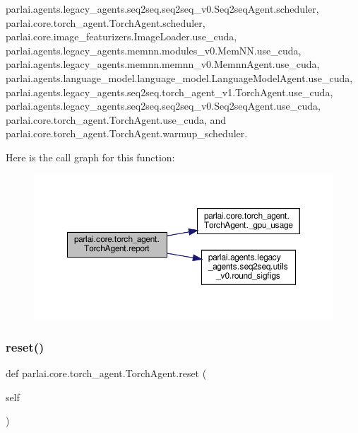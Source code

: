 parlai.\+agents.\+legacy\+\_\+agents.\+seq2seq.\+seq2seq\+\_\+v0.\+Seq2seq\+Agent.\+scheduler, parlai.\+core.\+torch\+\_\+agent.\+Torch\+Agent.\+scheduler, parlai.\+core.\+image\+\_\+featurizers.\+Image\+Loader.\+use\+\_\+cuda, parlai.\+agents.\+legacy\+\_\+agents.\+memnn.\+modules\+\_\+v0.\+Mem\+N\+N.\+use\+\_\+cuda, parlai.\+agents.\+legacy\+\_\+agents.\+memnn.\+memnn\+\_\+v0.\+Memnn\+Agent.\+use\+\_\+cuda, parlai.\+agents.\+language\+\_\+model.\+language\+\_\+model.\+Language\+Model\+Agent.\+use\+\_\+cuda, parlai.\+agents.\+legacy\+\_\+agents.\+seq2seq.\+torch\+\_\+agent\+\_\+v1.\+Torch\+Agent.\+use\+\_\+cuda, parlai.\+agents.\+legacy\+\_\+agents.\+seq2seq.\+seq2seq\+\_\+v0.\+Seq2seq\+Agent.\+use\+\_\+cuda, parlai.\+core.\+torch\+\_\+agent.\+Torch\+Agent.\+use\+\_\+cuda, and parlai.\+core.\+torch\+\_\+agent.\+Torch\+Agent.\+warmup\+\_\+scheduler.

Here is the call graph for this function\+:
\nopagebreak
\begin{figure}[H]
\begin{center}
\leavevmode
\includegraphics[width=350pt]{classparlai_1_1core_1_1torch__agent_1_1TorchAgent_ac694770cd4022eb047bf6fbb8f46035c_cgraph}
\end{center}
\end{figure}
\mbox{\label{classparlai_1_1core_1_1torch__agent_1_1TorchAgent_a6f568650dd8e245a274671680ebb7587}} 
\subsubsection{\texorpdfstring{reset()}{reset()}}
{\footnotesize\ttfamily def parlai.\+core.\+torch\+\_\+agent.\+Torch\+Agent.\+reset (\begin{DoxyParamCaption}\item[{}]{self }\end{DoxyParamCaption})}

